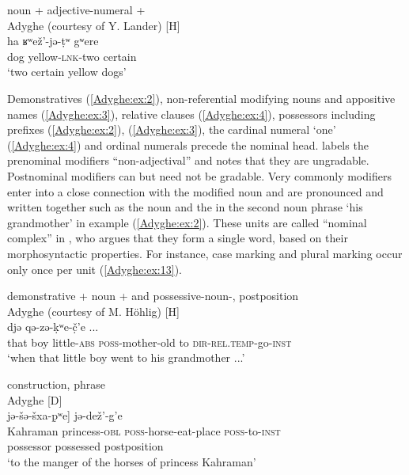 \documentclass[output=paper,colorlinks,citecolor=brown, draft]{langscibook}
\begin{document}
\ea\label{Adyghe:ex:1}
noun + adjective-numeral +  \\
Adyghe (courtesy of Y. Lander) [H] \\
\gll ha ʁʷež'-jə-ṭʷ gʷere \\
dog yellow\textsc{-lnk}-two certain \\
\glt `two certain yellow dogs' 
\z

Demonstratives (\ref{Adyghe:ex:2}), non-referential modifying nouns and appositive names (\ref{Adyghe:ex:3}), relative clauses (\ref{Adyghe:ex:4}), possessors including  prefixes (\ref{Adyghe:ex:2}), (\ref{Adyghe:ex:3}), the cardinal numeral `one' (\ref{Adyghe:ex:4}) and ordinal numerals precede the nominal head. \citet{lander2017nominal} labels the prenominal modifiers ``non-adjectival'' and notes that they are ungradable. Postnominal modifiers can but need not be gradable. Very commonly modifiers enter into a close connection with the modified noun and are pronounced and written together such as the noun and the  in the second noun phrase `his grandmother' in example (\ref{Adyghe:ex:2}). These units are called ``nominal complex'' in \citet{lander2017nominal}, who argues that they form a single word, based on their morphosyntactic properties. For instance, case marking and plural marking occur only once per unit (\ref{Adyghe:ex:13}).

\ea\label{Adyghe:ex:2}
demonstrative + noun +  and possessive-noun-, postposition \\
Adyghe (courtesy of M. Höhlig) [H] \\
 djə qə-zə-ḳʷe-č̣'e ... \\
that boy little\textsc{-abs} \textsc{poss-}mother-old to \textsc{dir-}\textsc{rel.temp}-go\textsc{-inst} \\
\glt `when that little boy went to his grandmother ...'
\z

\ea\label{Adyghe:ex:3}
 construction,  phrase \\
Adyghe \citep{paris1974princesse} [D] \\
\glll [[qahraman gʷaše-m] jə-šə-šxa-p̣ʷe] jə-dež'-g'e \\
Kahraman princess\textsc{-obl} \textsc{poss-}horse-eat-place \textsc{poss-}to\textsc{-inst} \\
possessor {} possessed postposition \\
\glt `to the manger of the horses of princess Kahraman'
\z
\end{document}
